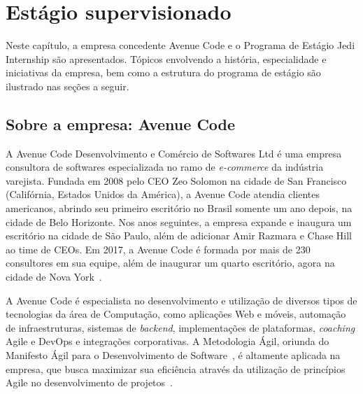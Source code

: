 \chapter{Estágio supervisionado}
\label{cap:estagio-supervisionado}

Neste capítulo, a empresa concedente Avenue Code e o Programa de Estágio Jedi Internship são apresentados. Tópicos envolvendo a história, especialidade e iniciativas da empresa, bem como a estrutura do programa de estágio são ilustrado nas seções a seguir.

\section{Sobre a empresa: Avenue Code}
\label{sec:sobre-a-empresa}

A Avenue Code Desenvolvimento e Comércio de Softwares Ltd é uma empresa consultora de softwares especializada no ramo de \textit{e-commerce} da indústria varejista. Fundada em 2008 pelo CEO Zeo Solomon na cidade de San Francisco (Califórnia, Estados Unidos da América), a Avenue Code atendia clientes americanos, abrindo seu primeiro escritório no Brasil somente um ano depois, na cidade de Belo Horizonte. Nos anos seguintes, a empresa expande e inaugura um escritório na cidade de São Paulo, além de adicionar Amir Razmara e Chase Hill ao time de CEOs. Em 2017, a Avenue Code é formada por mais de 230 consultores em sua equipe, além de inaugurar um quarto escritório, agora na cidade de Nova York~\cite{ac-who-we-are-2017}.

A Avenue Code é especialista no desenvolvimento e utilização de diversos tipos de tecnologias da área de Computação, como aplicações Web e móveis, automação de infraestruturas, sistemas de \textit{backend}, implementações de plataformas, \textit{coaching} Agile e DevOps e integrações corporativas. A Metodologia Ágil, oriunda do Manifesto Ágil para o Desenvolvimento de Software~\cite{agile-2001}, é altamente aplicada na empresa, que busca maximizar sua eficiência através da utilização de princípios Agile no desenvolvimento de projetos~\cite{ac-what-we-do-2017}.

